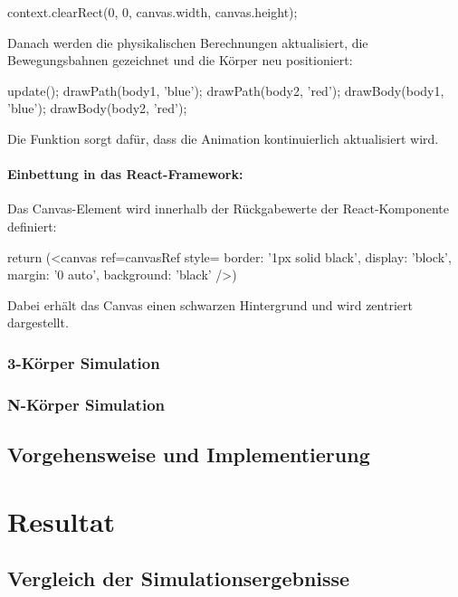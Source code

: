 \documentclass[a4paper,12pt,twoside]{article}
\begin{document}
\begin{javascript}
context.clearRect(0, 0, canvas.width, canvas.height);
\end{javascript}

Danach werden die physikalischen Berechnungen aktualisiert, die Bewegungsbahnen gezeichnet und die Körper neu positioniert:

\begin{javascript}
update();
drawPath(body1, 'blue');
drawPath(body2, 'red');
drawBody(body1, 'blue');
drawBody(body2, 'red');
\end{javascript}

Die Funktion  sorgt dafür, dass die Animation kontinuierlich aktualisiert wird.

\paragraph{Einbettung in das React-Framework:}
Das Canvas-Element wird innerhalb der Rückgabewerte der React-Komponente definiert:

\begin{javascript}
return (<canvas ref={canvasRef} style={{ border: '1px solid black', display: 'block', margin: '0 auto', background: 'black' }} />)
\end{javascript}
Dabei erhält das Canvas einen schwarzen Hintergrund und wird zentriert dargestellt.


\subsubsection{3-Körper Simulation}
\subsubsection{N-Körper Simulation}

\subsection{Vorgehensweise und Implementierung}

\section{Resultat}
\subsection{Vergleich der Simulationsergebnisse}
\end{document}
